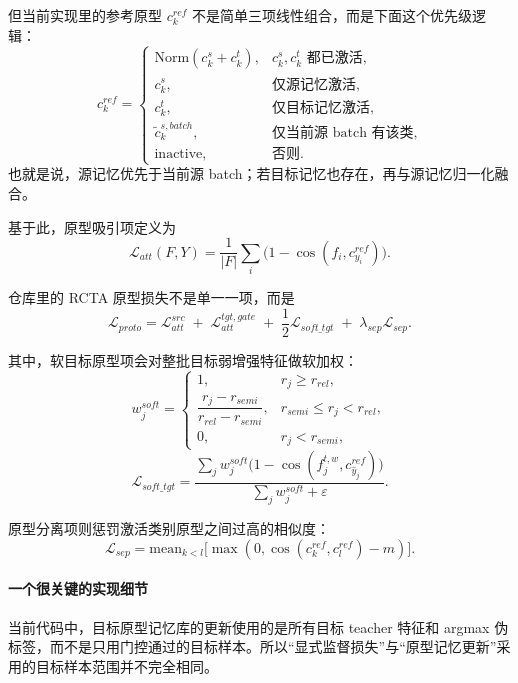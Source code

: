 \documentclass[12pt,a4paper]{ctexart}
\begin{document}
但当前实现里的参考原型 $c_k^{ref}$ 不是简单三项线性组合，而是下面这个优先级逻辑：
\begin{equation}
c_k^{ref}=
\begin{cases}
\mathrm{Norm}(c_k^s+c_k^t), & c_k^s,c_k^t \text{ 都已激活},\\
c_k^s, & \text{仅源记忆激活},\\
c_k^t, & \text{仅目标记忆激活},\\
\tilde c_k^{s,batch}, & \text{仅当前源 batch 有该类},\\
\text{inactive}, & \text{否则}.
\end{cases}
\end{equation}
也就是说，源记忆优先于当前源 batch；若目标记忆也存在，再与源记忆归一化融合。

基于此，原型吸引项定义为
\begin{equation}
\mathcal{L}_{att}(F,Y)
=
\frac{1}{|F|}
\sum_i \big(1-\cos(f_i,c_{y_i}^{ref})\big).
\end{equation}

仓库里的 RCTA 原型损失不是单一一项，而是
\begin{equation}
\mathcal{L}_{proto}
=
\mathcal{L}_{att}^{src}
\;+\;
\mathcal{L}_{att}^{tgt,gate}
\;+\;
\frac{1}{2}\mathcal{L}_{soft\_tgt}
\;+\;
\lambda_{sep}\mathcal{L}_{sep}.
\end{equation}

其中，软目标原型项会对整批目标弱增强特征做软加权：
\begin{equation}
w_j^{soft}=
\begin{cases}
1, & r_j\ge r_{rel},\\[4pt]
\dfrac{r_j-r_{semi}}{r_{rel}-r_{semi}}, & r_{semi}\le r_j<r_{rel},\\[8pt]
0, & r_j<r_{semi},
\end{cases}
\end{equation}
\begin{equation}
\mathcal{L}_{soft\_tgt}
=
\frac{
\sum_j w_j^{soft}\big(1-\cos(f_j^{t,w},c_{\hat y_j}^{ref})\big)
}{
\sum_j w_j^{soft}+\varepsilon
}.
\end{equation}

原型分离项则惩罚激活类别原型之间过高的相似度：
\begin{equation}
\mathcal{L}_{sep}
=
\mathrm{mean}_{k<l}
\Big[\max(0,\cos(c_k^{ref},c_l^{ref})-m)\Big].
\end{equation}

\paragraph{一个很关键的实现细节} 当前代码中，目标原型记忆库的更新使用的是所有目标 teacher 特征和 argmax 伪标签，而不是只用门控通过的目标样本。所以“显式监督损失”与“原型记忆更新”采用的目标样本范围并不完全相同。
\end{document}
